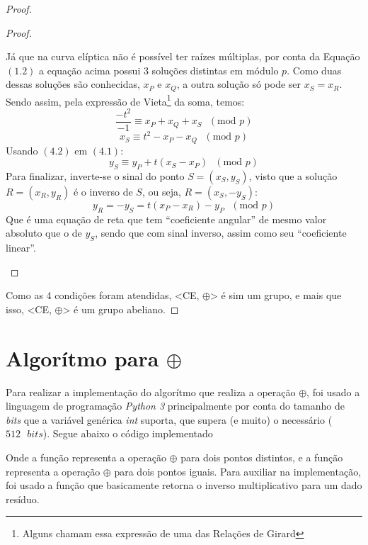 \documentclass[14pt, oneside]{book}
\newcommand\tab[1][1cm]{\hspace*{#1}}
\theoremstyle{definition}
\begin{document}
\begin{proof}
\begin{proof}
\begin{enumerate}
                            Já que na curva elíptica não é possível ter raízes múltiplas, por conta da Equação $(1.2)$ a equação acima possui $3$ soluções distintas em módulo $p$. Como duas dessas soluções são conhecidas, $x_P$ e $x_Q$, a outra solução só pode ser $x_S = x_R$. Sendo assim, pela expressão de Vieta\footnote{Alguns chamam essa expressão de uma das Relações de Girard} da soma, temos:
                            $$\frac{-t^2}{-1} \equiv x_P + x_Q + x_S\textrm{ }(\textrm{mod }p)$$
                            \begin{equation}
                                x_S \equiv t^2 - x_P - x_Q\textrm{ }(\textrm{mod }p)
                            \end{equation}
                            Usando $(4.2)$ em $(4.1)$:
                            $$y_S \equiv y_P + t(x_S - x_P)\textrm{ }(\textrm{mod }p)$$
                            Para finalizar, inverte-se o sinal do ponto $S = (x_S, y_S)$, visto que a solução $R=(x_R,y_R)$ é o inverso de $S$, ou seja, $R = (x_S, -y_S)$:
                            $$y_R = -y_S = t(x_P-x_R) - y_P\textrm{ }(\textrm{mod }p)$$
                            Que é uma equação de reta que tem ``coeficiente angular'' de mesmo valor absoluto que o de $y_S$, sendo que com sinal inverso, assim como seu ``coeficiente linear''. 
                        \end{enumerate}
                    \end{proof}
                    Como as 4 condições foram atendidas, <CE, $\oplus$> é sim um grupo, e mais que isso, <CE, $\oplus$> é um grupo abeliano.
                \end{proof}
                
            \section{Algorítmo para $\oplus$}
                \tab Para realizar a implementação do algorítmo que realiza a operação $\oplus$, foi usado a linguagem de programação \textit{Python 3} principalmente por conta do tamanho de \textit{bits} que a variável genérica \textit{int} suporta, que supera (e muito) o necessário ($512\textit{ }bits$). Segue abaixo o código implementado
                
                
                \tab Onde a função  representa a operação $\oplus$ para dois pontos distintos, e a função  representa a operação $\oplus$ para dois pontos iguais. Para auxiliar na implementação, foi usado a função  que basicamente retorna o inverso multiplicativo para um dado resíduo.
                
\end{document}

